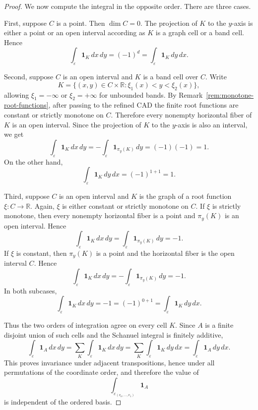 \documentclass[10pt,a4paper]{amsart}
\begin{document}
\begin{proof}
We now compute the integral in the opposite order.  There are three cases.

First, suppose \(C\) is a point.  Then \(\dim C=0\).  The projection of \(K\)
to the \(y\)-axis is either a point or an open interval according as \(K\) is a
graph cell or a band cell.  Hence
\[
  \int_{\varepsilon}\mathbf{1}_K\,dx\,dy
  =
  (-1)^d
  =
  \int_{\varepsilon}\mathbf{1}_K\,dy\,dx .
\]

Second, suppose \(C\) is an open interval and \(K\) is a band cell over \(C\).
Write
\[
  K=\{(x,y)\in C\times\mathbb{R}:\xi_1(x)<y<\xi_2(x)\},
\]
allowing \(\xi_1=-\infty\) or \(\xi_2=+\infty\) for unbounded bands.  By
Remark~\ref{rem:monotone-root-functions}, after passing to the refined CAD the
finite root functions are constant or strictly monotone on \(C\).  Therefore
every nonempty horizontal fiber of \(K\) is an open interval.  Since the
projection of \(K\) to the \(y\)-axis is also an interval, we get
\[
  \int_{\varepsilon}\mathbf{1}_K\,dx\,dy
  =
  -\int_{\varepsilon}\mathbf{1}_{\pi_y(K)}\,dy
  =
  (-1)(-1)
  =
  1.
\]
On the other hand,
\[
  \int_{\varepsilon}\mathbf{1}_K\,dy\,dx
  =
  (-1)^{1+1}
  =
  1.
\]

Third, suppose \(C\) is an open interval and \(K\) is the graph of a root
function \(\xi:C\to\mathbb{R}\).  Again, \(\xi\) is either constant or strictly
monotone on \(C\).  If \(\xi\) is strictly monotone, then every nonempty
horizontal fiber is a point and \(\pi_y(K)\) is an open interval.  Hence
\[
  \int_{\varepsilon}\mathbf{1}_K\,dx\,dy
  =
  \int_{\varepsilon}\mathbf{1}_{\pi_y(K)}\,dy
  =
  -1.
\]
If \(\xi\) is constant, then \(\pi_y(K)\) is a point and the horizontal fiber is
the open interval \(C\).  Hence
\[
  \int_{\varepsilon}\mathbf{1}_K\,dx\,dy
  =
  -\int_{\varepsilon}\mathbf{1}_{\pi_y(K)}\,dy
  =
  -1.
\]
In both subcases,
\[
  \int_{\varepsilon}\mathbf{1}_K\,dx\,dy
  =
  -1
  =
  (-1)^{0+1}
  =
  \int_{\varepsilon}\mathbf{1}_K\,dy\,dx .
\]

Thus the two orders of integration agree on every cell \(K\).  Since \(A\) is a
finite disjoint union of such cells and the Schanuel integral is finitely
additive,
\[
  \int_{\varepsilon}\mathbf{1}_A\,dx\,dy
  =
  \sum_K
  \int_{\varepsilon}\mathbf{1}_K\,dx\,dy
  =
  \sum_K
  \int_{\varepsilon}\mathbf{1}_K\,dy\,dx
  =
  \int_{\varepsilon}\mathbf{1}_A\,dy\,dx .
\]
This proves invariance under adjacent transpositions, hence under all
permutations of the coordinate order, and therefore the value of
\[
  \int_{\varepsilon_{(v_n,\ldots,v_1)}} \mathbf{1}_A
\]
is independent of the ordered basis.
\end{proof}
\end{document}
